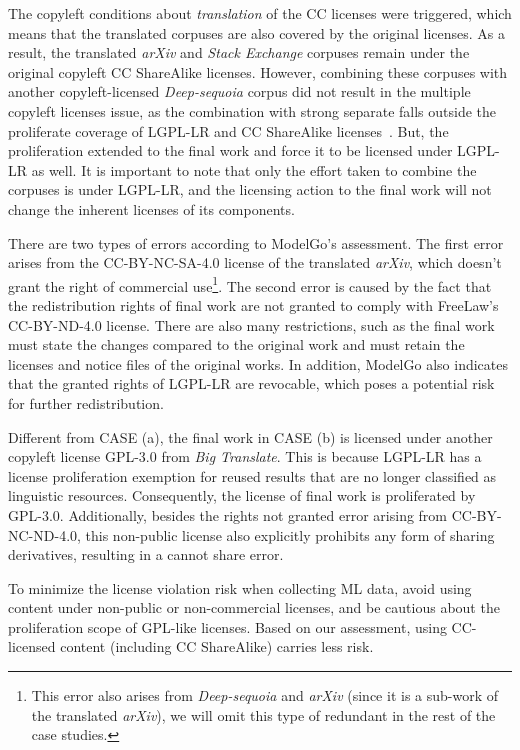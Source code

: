 The copyleft conditions about \textit{translation} of the CC licenses were triggered, which means that the translated corpuses are also covered by the original licenses.
As a result, the translated \textit{arXiv} and \textit{Stack Exchange} corpuses remain under the original copyleft CC ShareAlike licenses. 
However, combining these corpuses with another copyleft-licensed \textit{Deep-sequoia} corpus did not result in the multiple copyleft licenses issue, as the combination with strong separate falls outside the proliferate coverage of LGPL-LR and CC ShareAlike licenses~\cite{creative2023artificial}.
But, the proliferation extended to the final work and force it to be licensed under LGPL-LR as well.
It is important to note that only the effort taken to combine the corpuses is under LGPL-LR, and the licensing action to the final work will not change the inherent licenses of its components.

There are two types of errors according to ModelGo's assessment.
The first error arises from the CC-BY-NC-SA-4.0 license of the translated \textit{arXiv}, which doesn't grant the right of commercial use\footnote{This error also arises from \textit{Deep-sequoia} and \textit{arXiv} (since it is a sub-work of the translated \textit{arXiv}), we will omit this type of redundant in the rest of the case studies.}. 
The second error is caused by the fact that the redistribution rights of final work are not granted to comply with FreeLaw's CC-BY-ND-4.0 license.
There are also many restrictions, such as the final work must state the changes compared to the original work and must retain the licenses and notice files of the original works.
In addition, ModelGo also indicates that the granted rights of LGPL-LR are revocable, which poses a potential risk for further redistribution.

Different from CASE  (a), the final work in CASE  (b) is licensed under another copyleft license GPL-3.0 from \textit{Big Translate}.
This is because LGPL-LR has a license proliferation exemption for reused results that are no longer classified as linguistic resources.
Consequently, the license of final work is proliferated by GPL-3.0.
Additionally, besides the rights not granted error arising from CC-BY-NC-ND-4.0, this non-public license also explicitly prohibits any form of sharing derivatives, resulting in a cannot share error.

To minimize the license violation risk when collecting ML data, avoid using content under non-public or non-commercial licenses, and be cautious about the proliferation scope of GPL-like licenses.
Based on our assessment, using CC-licensed content (including CC ShareAlike) carries less risk.


